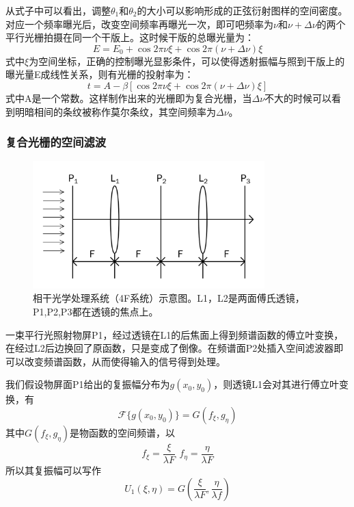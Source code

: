 \documentclass[aps,pre,12pt,preprint,onecolumn,showpacs,showkeys,UTF8]{revtex4-1}
\begin{document}
从式子中可以看出，调整$\theta_1$和$\theta_2$的大小可以影响形成的正弦衍射图样的空间密度。对应一个频率曝光后，改变空间频率再曝光一次，即可吧频率为$\nu$和$\nu+\Delta\nu$的两个平行光栅拍摄在同一个干版上。这时候干版的总曝光量为：
\begin{equation}
	E=E_0+\cos{2\pi\nu\xi}+\cos{2\pi(\nu+\Delta\nu)\xi}
\end{equation}
式中$\xi$为空间坐标，正确的控制曝光显影条件，可以使得透射振幅与照到干版上的曝光量E成线性关系，则有光栅的投射率为：
\begin{equation}
	t=A-\beta[\cos{2\pi\nu\xi}+\cos{2\pi(\nu+\Delta\nu)\xi}]
\end{equation}
式中A是一个常数。这样制作出来的光栅即为复合光栅，当$\Delta\nu$不大的时候可以看到明暗相间的条纹被称作莫尔条纹，其空间频率为$\Delta \nu$。

\subsubsection{复合光栅的空间滤波}

\begin{figure}[h]
	\begin{center}
		\includegraphics[width=0.8\textwidth]{pic2.png}
		\caption{\label{fig:exp2}相干光学处理系统（4F系统）示意图。L1，L2是两面傅氏透镜，P1,P2,P3都在透镜的焦点上。}
	\end{center}
\end{figure}

一束平行光照射物屏P1，经过透镜在L1的后焦面上得到频谱函数的傅立叶变换，在经过L2后边换回了原函数，只是变成了倒像。在频谱面P2处插入空间滤波器即可以改变频谱函数，从而使得输入的信号得到处理。

我们假设物屏面P1给出的复振幅分布为$g(x_0,y_0)$，则透镜L1会对其进行傅立叶变换，有
\begin{equation}
	\mathscr{F} \{ g(x_0,y_0) \} =G(f_\xi,g_\eta)
\end{equation}
其中$G(f_\xi,g_\eta)$是物函数的空间频谱，以
$$f_\xi=\frac{\xi}{\lambda F}\ \, f_\eta=\frac{\eta}{\lambda F}$$
所以其复振幅可以写作
\begin{equation}
	U_1(\xi,\eta)=G(\frac{\xi}{\lambda F},\frac{\eta}{\lambda f})
\end{equation}
\end{document}
